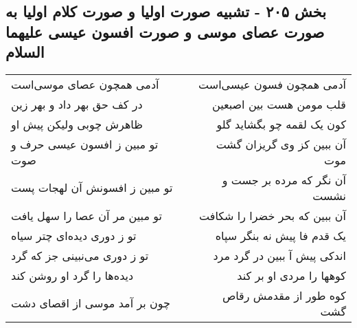 \begin{center}
\section*{بخش ۲۰۵ - تشبیه صورت اولیا و صورت کلام اولیا به صورت عصای موسی و صورت افسون عیسی علیهما السلام}
\label{sec:sh205}
\begin{longtable}{l p{0.5cm} r}
آدمی همچون عصای موسی‌است
&&
آدمی همچون فسون عیسی‌است
\\
در کف حق بهر داد و بهر زین
&&
قلب مومن هست بین اصبعین
\\
ظاهرش چوبی ولیکن پیش او
&&
کون یک لقمه چو بگشاید گلو
\\
تو مبین ز افسون عیسی حرف و صوت
&&
آن ببین کز وی گریزان گشت موت
\\
تو مبین ز افسونش آن لهجات پست
&&
آن نگر که مرده بر جست و نشست
\\
تو مبین مر آن عصا را سهل یافت
&&
آن ببین که بحر خضرا را شکافت
\\
تو ز دوری دیده‌ای چتر سیاه
&&
یک قدم فا پیش نه بنگر سپاه
\\
تو ز دوری می‌نبینی جز که گرد
&&
اندکی پیش آ ببین در گرد مرد
\\
دیده‌ها را گرد او روشن کند
&&
کوهها را مردی او بر کند
\\
چون بر آمد موسی از اقصای دشت
&&
کوه طور از مقدمش رقاص گشت
\\
\end{longtable}
\end{center}
